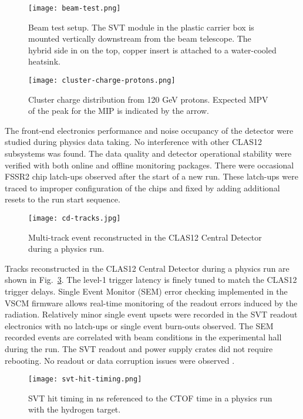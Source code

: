 \begin{figure}[hbt] 
\centering 
\texttt{[image: beam-test.png]}
\caption{Beam test setup. The SVT module in the plastic carrier box is mounted vertically downstream from the beam telescope. The hybrid side in on the top, copper insert is attached to a water-cooled heatsink.}
\label{fig:beam-test}
\end{figure}

\begin{figure}[h] 
\centering 
\texttt{[image: cluster-charge-protons.png]}
\caption{Cluster charge distribution from 120 GeV protons. Expected MPV of the peak for the MIP is indicated by the arrow.}
\label{fig:cluster-charge-protons}
\end{figure}

The front-end electronics performance and noise occupancy of the detector were studied during physics data taking. No interference with other CLAS12 subsystems was found. The data quality and detector operational stability  were verified with both online and offline monitoring packages. There were occasional FSSR2 chip latch-ups observed after the start of a new run. These latch-ups were traced to improper configuration of the chips and fixed by adding additional resets to the run start sequence.

\begin{figure}[h] 
\centering 
\texttt{[image: cd-tracks.jpg]}
\caption{Multi-track event reconstructed in the CLAS12 Central Detector during a physics run.}
\label{fig:cd-tracks}
\end{figure}

Tracks reconstructed in the CLAS12 Central Detector during a physics run are shown in Fig.~\ref{fig:cd-tracks}. The level-1 trigger latency is finely tuned to match the CLAS12 trigger delays. Single Event Monitor (SEM) error checking implemented in the VSCM firmware allows real-time monitoring of the readout errors induced by the radiation. Relatively minor single event upsets were recorded in the SVT readout electronics with no latch-ups or single event burn-outs observed. The SEM recorded events are correlated with beam conditions in the experimental hall during the run. The SVT readout and power supply crates did not require rebooting. No readout or data corruption issues were observed \cite{SEENOTE}. 

\begin{figure}[htb] 
\centering 
\texttt{[image: svt-hit-timing.png]}
\caption{SVT hit timing in ns referenced to the CTOF time in a physics run with the hydrogen target.}
\label{fig:svt-hit-timing}
\end{figure}

